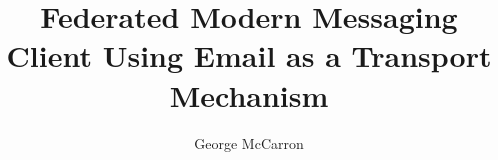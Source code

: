 \documentclass[a4paper,12pt,oneside]{report}
\begin{document}
\title{Federated Modern Messaging Client Using Email as a Transport Mechanism}

\author{George McCarron}

\normallinespacing
\maketitle


\preface
\clearpage
{}




\body








\clearpage
{}
{}


\mediumlinespacing





\end{document}
